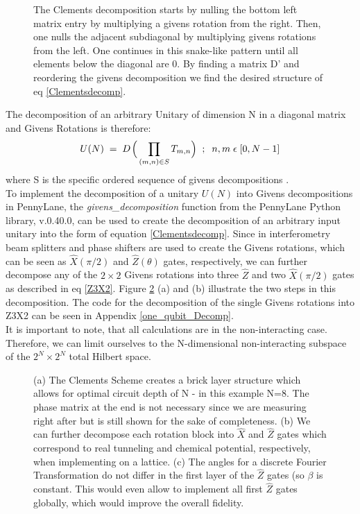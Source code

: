 \begin{figure}
    \centering
    \caption[Clements decomposition scheme]{The Clements decomposition starts by nulling the bottom left matrix entry by multiplying a givens rotation from the right. Then, one nulls the adjacent subdiagonal by multiplying givens rotations from the left. One continues in this snake-like pattern until all elements below the diagonal are 0. By finding a matrix D' and reordering the givens decomposition we find the desired structure of eq \ref{Clementsdecomp}.}
    \label{fig:clementsdecompstructure}
\end{figure}
The decomposition of an arbitrary Unitary of dimension N in a diagonal matrix and Givens Rotations is therefore:
\begin{align}
    U(N) \;=\; D\;\!\Bigl(\,\prod_{(m,n)\in S} T_{m,n}\Bigr) \;\; ; \;\; n,m \;\epsilon \;[0, N-1]
    \label{Clementsdecomp}
\end{align}
where S is the specific ordered sequence of givens decompositions \cite{Clements:16}.\\
To implement the decomposition of a unitary $U(N)$ into Givens decompositions in PennyLane, the \textit{givens\_decomposition} function from the PennyLane Python library, v.0.40.0, can be used to create the decomposition of an arbitrary input unitary into the form of equation \ref{Clementsdecomp}. Since in interferometry beam splitters and phase shifters are used to create the Givens rotations, which can be seen as $\widehat{X}(\pi/2)$ and $\widehat{Z}(\theta)$ gates, respectively, we can further decompose any of the $2\times2$ Givens rotations into three $\widehat{Z}$ and two $\widehat{X}(\pi/2)$ gates as described in eq \ref{Z3X2}. Figure \ref{fig:Heatmap} (a) and (b) illustrate the two steps in this decomposition. The code for the decomposition of the single Givens rotations into Z3X2 can be seen in Appendix \ref{one_qubit_Decomp}. \\
It is important to note, that all calculations are in the non-interacting case. Therefore, we can limit ourselves to the N-dimensional non-interacting subspace of the $2^N \times 2^N$ total Hilbert space.

\begin{figure}[t]
    \centering
    \caption[Clements Scheme Example Circuit with angles and Rotation decomposition into Z3X2]{(a) The Clements Scheme creates a brick layer structure which allows for optimal circuit depth of N - in this example N=8. The phase matrix at the end is not necessary since we are measuring right after but is still shown for the sake of completeness. (b) We can further decompose each rotation block into $\widehat{X}$ and $\widehat{Z}$ gates which correspond to real tunneling and chemical potential, respectively, when implementing on a lattice. (c) The angles for a discrete Fourier Transformation do not differ in the first layer of the $\widehat{Z}$ gates (so $\beta$ is constant. This would even allow to implement all first $\widehat{Z}$ gates globally, which would improve the overall fidelity.}
    \label{fig:Heatmap}
\end{figure}

